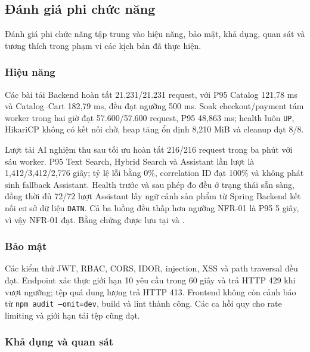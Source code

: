 \subsection{Đánh giá phi chức năng}

Đánh giá phi chức năng tập trung vào hiệu năng, bảo mật, khả dụng, quan sát và tương thích trong phạm vi các kịch bản đã thực hiện.

\subsubsection{Hiệu năng}

Các bài tải Backend hoàn tất 21.231/21.231 request, với P95 Catalog 121,78 ms và Catalog--Cart 182,79 ms, đều đạt ngưỡng 500 ms. Soak checkout/payment tám worker trong hai giờ đạt 57.600/57.600 request, P95 48,863 ms; health luôn \texttt{UP}, HikariCP không có kết nối chờ, heap tăng ổn định 8,210 MiB và cleanup đạt 8/8.

Lượt tải AI nghiệm thu sau tối ưu hoàn tất 216/216 request trong ba phút với sáu worker. P95 Text Search, Hybrid Search và Assistant lần lượt là 1,412/3,412/2,776 giây; tỷ lệ lỗi bằng 0\%, correlation ID đạt 100\% và không phát sinh fallback Assistant. Health trước và sau phép đo đều ở trạng thái sẵn sàng, đồng thời đủ 72/72 lượt Assistant lấy ngữ cảnh sản phẩm từ Spring Backend kết nối cơ sở dữ liệu \texttt{DATN}. Cả ba luồng đều thấp hơn ngưỡng NFR-01 là P95 5 giây, vì vậy NFR-01 đạt. Bằng chứng được lưu tại  và .

\subsubsection{Bảo mật}

Các kiểm thử JWT, RBAC, CORS, IDOR, injection, XSS và path traversal đều đạt. Endpoint xác thực giới hạn 10 yêu cầu trong 60 giây và trả HTTP 429 khi vượt ngưỡng; tệp quá dung lượng trả HTTP 413. Frontend không còn cảnh báo từ \texttt{npm audit --omit=dev}, build và lint thành công. Các ca hồi quy cho rate limiting và giới hạn tải tệp cũng đạt.

\subsubsection{Khả dụng và quan sát}


